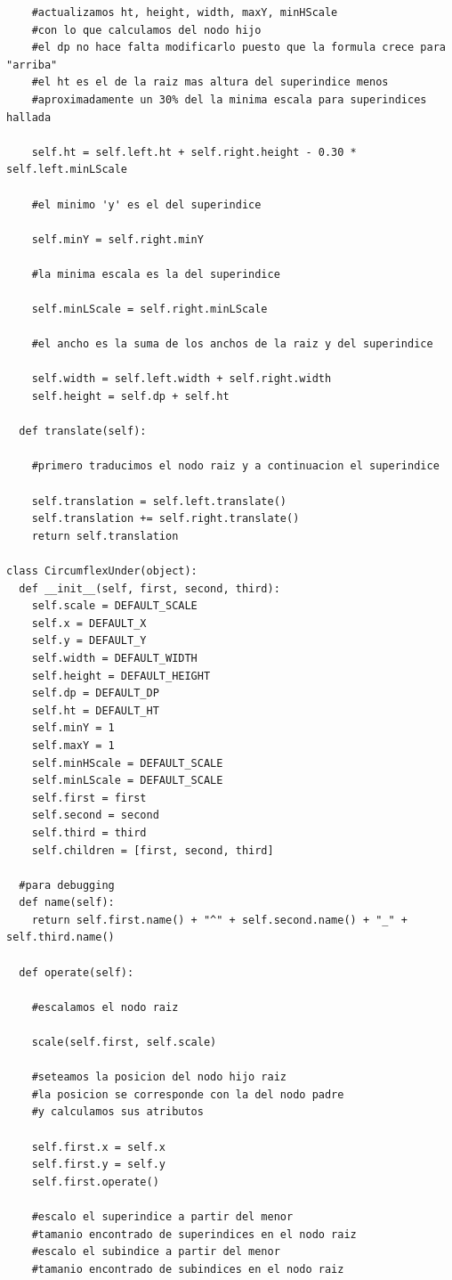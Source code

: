\begin{verbatim}
    #actualizamos ht, height, width, maxY, minHScale 
    #con lo que calculamos del nodo hijo
    #el dp no hace falta modificarlo puesto que la formula crece para "arriba"
    #el ht es el de la raiz mas altura del superindice menos
    #aproximadamente un 30% del la minima escala para superindices hallada

    self.ht = self.left.ht + self.right.height - 0.30 * self.left.minLScale
    
    #el minimo 'y' es el del superindice
    
    self.minY = self.right.minY
    
    #la minima escala es la del superindice
    
    self.minLScale = self.right.minLScale
    
    #el ancho es la suma de los anchos de la raiz y del superindice
    
    self.width = self.left.width + self.right.width
    self.height = self.dp + self.ht
  
  def translate(self):
    
    #primero traducimos el nodo raiz y a continuacion el superindice
    
    self.translation = self.left.translate()
    self.translation += self.right.translate()
    return self.translation

class CircumflexUnder(object):
  def __init__(self, first, second, third):
    self.scale = DEFAULT_SCALE
    self.x = DEFAULT_X
    self.y = DEFAULT_Y
    self.width = DEFAULT_WIDTH
    self.height = DEFAULT_HEIGHT
    self.dp = DEFAULT_DP
    self.ht = DEFAULT_HT
    self.minY = 1
    self.maxY = 1
    self.minHScale = DEFAULT_SCALE
    self.minLScale = DEFAULT_SCALE
    self.first = first
    self.second = second
    self.third = third
    self.children = [first, second, third]

  #para debugging
  def name(self):
    return self.first.name() + "^" + self.second.name() + "_" + self.third.name()

  def operate(self):
    
    #escalamos el nodo raiz
    
    scale(self.first, self.scale)

    #seteamos la posicion del nodo hijo raiz
    #la posicion se corresponde con la del nodo padre
    #y calculamos sus atributos
    
    self.first.x = self.x
    self.first.y = self.y
    self.first.operate()

    #escalo el superindice a partir del menor 
    #tamanio encontrado de superindices en el nodo raiz
    #escalo el subindice a partir del menor 
    #tamanio encontrado de subindices en el nodo raiz


\end{verbatim}
